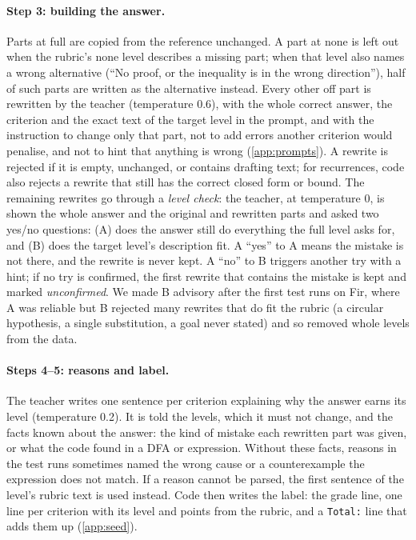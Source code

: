 \documentclass[11pt,a4paper]{article}
\newcommand{\lvl}[1]{\textsf{#1}}
\theoremstyle{definition}
\begin{document}
\paragraph{Step 3: building the answer.}
Parts at \lvl{full} are copied from the reference unchanged. A part at \lvl{none} is left out when the rubric's \lvl{none} level describes a missing part; when that level also names a wrong alternative (``No proof, or the inequality is in the wrong direction''), half of such parts are written as the alternative instead. Every other off part is rewritten by the teacher (temperature 0.6), with the whole correct answer, the criterion and the exact text of the target level in the prompt, and with the instruction to change only that part, not to add errors another criterion would penalise, and not to hint that anything is wrong (\cref{app:prompts}). A rewrite is rejected if it is empty, unchanged, or contains drafting text; for recurrences, code also rejects a rewrite that still has the correct closed form or bound. The remaining rewrites go through a \emph{level check}: the teacher, at temperature 0, is shown the whole answer and the original and rewritten parts and asked two yes/no questions: (A) does the answer still do everything the \lvl{full} level asks for, and (B) does the target level's description fit. A ``yes'' to A means the mistake is not there, and the rewrite is never kept. A ``no'' to B triggers another try with a hint; if no try is confirmed, the first rewrite that contains the mistake is kept and marked \emph{unconfirmed}. We made B advisory after the first test runs on Fir, where A was reliable but B rejected many rewrites that do fit the rubric (a circular hypothesis, a single substitution, a goal never stated) and so removed whole levels from the data.

\paragraph{Steps 4--5: reasons and label.}
The teacher writes one sentence per criterion explaining why the answer earns its level (temperature 0.2). It is told the levels, which it must not change, and the facts known about the answer: the kind of mistake each rewritten part was given, or what the code found in a DFA or expression. Without these facts, reasons in the test runs sometimes named the wrong cause or a counterexample the expression does not match. If a reason cannot be parsed, the first sentence of the level's rubric text is used instead. Code then writes the label: the grade line, one line per criterion with its level and points from the rubric, and a \texttt{Total:} line that adds them up (\cref{app:seed}).
\end{document}
